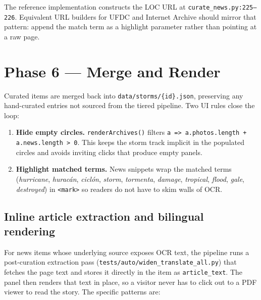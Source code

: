 \documentclass[11pt,letterpaper]{article}
\begin{document}
The reference implementation constructs the LOC URL at \texttt{curate\_news.py:225--226}. Equivalent URL builders for UFDC and Internet Archive should mirror that pattern: append the match term as a highlight parameter rather than pointing at a raw page.

\section{Phase 6 --- Merge and Render}

Curated items are merged back into \texttt{data/storms/\{id\}.json}, preserving any hand-curated entries not sourced from the tiered pipeline. Two UI rules close the loop:

\begin{enumerate}[leftmargin=1.5em]
  \item \textbf{Hide empty circles.} \texttt{renderArchives()} filters \texttt{a => a.photos.length + a.news.length > 0}. This keeps the storm track implicit in the populated circles and avoids inviting clicks that produce empty panels.
  \item \textbf{Highlight matched terms.} News snippets wrap the matched terms (\emph{hurricane}, \emph{hurac\'an}, \emph{cicl\'on}, \emph{storm}, \emph{tormenta}, \emph{damage}, \emph{tropical}, \emph{flood}, \emph{gale}, \emph{destroyed}) in \texttt{<mark>} so readers do not have to skim walls of OCR.
\end{enumerate}

\subsection{Inline article extraction and bilingual rendering}

For news items whose underlying source exposes OCR text, the pipeline runs a post-curation extraction pass (\texttt{tests/auto/widen\_translate\_all.py}) that fetches the page text and stores it directly in the item as \texttt{article\_text}. The panel then renders that text in place, so a visitor never has to click out to a PDF viewer to read the story. The specific patterns are:
\end{document}
